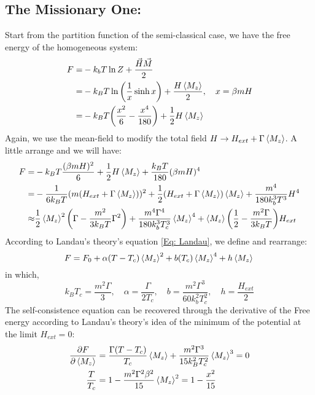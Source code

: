\documentclass[a4paper]{article}
\begin{document}
\subsection{The Missionary One:}
\quad Start from the partition function of the semi-classical case, we have the free energy of the homogeneous system:
\begin{align}
	F =& -k_b T \ln Z + \frac{\vec{H}\vec{M}}{2}\nonumber\\
	 =& -k_B T \ln \bigg(\frac{1}{x} \sinh x\bigg) + \frac{H \ev{M_z}}{2},\quad x = \beta m H\nonumber\\\label{Eq: Landau}
	 =& - k_B T \bigg(\frac{x^2}{6} - \frac{x^4}{180}\bigg) + \frac{1}{2} H \ev{M_z}
\end{align}
Again, we use the mean-field to modify the total field \(H \to H_{ext} + \Gamma \ev{M_z}\). A little arrange and we will have:
\begin{align}
	F =& - k_B T \frac{(\beta m H)^2}{6} + \frac{1}{2} H \ev{M_z} + \frac{k_B T}{180} (\beta m H)^4 \nonumber \\
	=& -\frac{1}{6 k_B T} (m(H_{ext} + \Gamma \ev{M_z}))^2 + \frac{1}{2}(H_{ext} + \Gamma \ev{M_z}) \ev{M_z} + \frac{m^4}{180 k_b^3 T^3} H^4\nonumber\\
	\approx& \frac{1}{2} \ev{M_z}^2 \bigg(\Gamma - \frac{m^2}{3k_B T} \Gamma^2\bigg) + \frac{m^4 \Gamma^4}{180 k_b^3 T_c^3} \ev{M_z}^4  + \ev{M_z} \bigg(\frac{1}{2}- \frac{m^2 \Gamma}{3k_B T}\bigg)H_{ext}\\
\end{align}
According to Landau's theory's equation \eqref{Eq: Landau}, we define and rearrange:
\begin{equation}
	F = F_0 + \alpha (T -T_c) \ev{M_z}^2 + b(T_c) \ev{M_z}^4 + h\ev{M_z}\\
\end{equation}
in which,
\begin{equation}
	k_B T_c = \frac{m^2 \Gamma}{3}, \quad \alpha = \frac{\Gamma}{2T_c},\quad b = \frac{m^2\Gamma^3}{60k_b^2 T_c^2}, \quad h = \frac{H_{ext}}{2}
\end{equation}
\quad The self-consistence equation can be recovered through the derivative of the Free energy according to Landau's theory's idea of the minimum of the potential at the limit \(H_{ext} = 0\):
\begin{align}
	\pdv{F}{\ev{M_z}} &= \frac{\Gamma(T - T_c)}{T_c} \ev{M_z} + \frac{m^2 \Gamma^3}{15k_B^2 T_c^2} \ev{M_z}^3 = 0 \nonumber \\
	\frac{T}{T_c} &= 1 - \frac{m^2\Gamma^2 \beta^2}{15}\ev{M_z}^2 = 1- \frac{x^2}{15}
\end{align}
\end{document}
